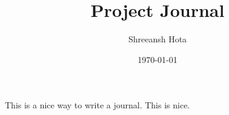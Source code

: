 \documentclass{article}
\title{Project Journal}
\author{Shreeansh Hota}
\date{\today}
\begin{document}
\maketitle

This is a nice way to write a journal. This is nice.
\end{document}
